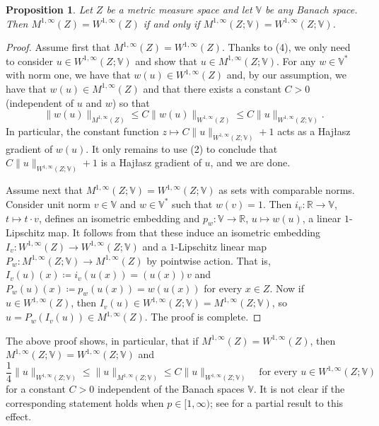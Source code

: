 \documentclass[reqno]{amsart}
\numberwithin{equation}{section}
\newtheorem{proposition}[theorem]{Proposition}
\theoremstyle{remark}
\begin{document}
\begin{proposition}\label{prop:M=W_Banach-valued}
Let $Z$ be a metric measure space and let $\mathbb V$ be any Banach space. Then  $M^{1,\infty}(Z)=W^{1,\infty}(Z)$ if and only if  $M^{1,\infty}(Z;\mathbb V)=W^{1,\infty}(Z;\mathbb V)$.
\end{proposition}
\begin{proof}
Assume first that $M^{1,\infty}(Z)=W^{1,\infty}(Z)$. Thanks to  (4), we only need to consider $u\in W^{1,\infty}(Z;\mathbb V)$ and show that $u\in M^{1,\infty}(Z;\mathbb V)$. For any $w\in \mathbb V^*$ with norm one, we have that $w(u)\in W^{1,\infty}(Z)$ and, by our assumption, we have that $w(u)\in M^{1,\infty}(Z)$ and that there exists a constant $C>0$ (independent of $u$ and $w$) so that
$$\|w(u)\|_{M^{1,\infty}(Z)}\leq C\|w(u)\|_{W^{1,\infty}(Z)} \leq C\|u\|_{W^{1,\infty}(Z;\mathbb{V})} .$$
In particular, the constant function $z \mapsto C\|u\|_{W^{1,\infty}(Z;\mathbb{V})}+1$ acts as a Haj{\l}asz gradient of $w(u)$. It only remains to use  (2) to conclude that $C\|u\|_{W^{1,\infty}(Z;\mathbb V)}+1$ is a Haj{\l}asz gradient of $u$, and we are done.

Assume next that $M^{1,\infty}(Z;\mathbb V)=W^{1,\infty}(Z;\mathbb V)$ as sets with comparable norms. Consider unit norm $v \in \mathbb{V}$ and $w \in \mathbb{V}^{*}$ such that $w(v) = 1$. Then $i_v \colon \mathbb{R} \rightarrow \mathbb{V}$, $t \mapsto t \cdot v$, defines an isometric embedding and $p_w \colon \mathbb{V} \rightarrow \mathbb{R}$, $u \mapsto w(u)$, a linear $1$-Lipschitz map. It follows from  that these induce an isometric embedding $I_v \colon W^{1,\infty}(Z) \rightarrow W^{1,\infty}(Z; \mathbb{V})$ 
and a $1$-Lipschitz linear map $P_w \colon M^{1,\infty}(Z; \mathbb{V}) \rightarrow M^{1,\infty}(Z)$ by pointwise action. That is, $I_v(u)(x)\coloneqq i_v(u(x))=(u(x))v$ and $P_{w}(u)(x)\coloneqq p_w(u(x))=w(u(x))$ for every $x\in Z$. Now if $u \in W^{1,\infty}(Z)$, then $I_v(u) \in W^{1,\infty}(Z; \mathbb{V}) = M^{1,\infty}(Z; \mathbb{V})$, so $u = P_w( I_v(u) ) \in M^{1,\infty}(Z)$. The proof is complete.
\end{proof}
The above proof shows, in particular, that if $M^{1,\infty}(Z)=W^{1,\infty}(Z)$, then $M^{1,\infty}(Z;\mathbb V)=W^{1,\infty}(Z;\mathbb V)$ and
$$\frac{1}{4}\| u  \|_{W^{1,\infty}(Z;\mathbb V)} \leq \|u\|_{M^{1,\infty}(Z;\mathbb V)}\leq C\| u\|_{W^{1,\infty}(Z;\mathbb V)}\quad \text{for every } u\in W^{1,\infty}(Z;\mathbb V)$$
for a constant $C>0$ independent of the Banach spaces $\mathbb V$. It is not clear if the corresponding statement holds when $p \in [1,\infty)$; see \cite[Theorem 1.6]{Garc:Iko:Zhu:23} for a partial result to this effect.
\end{document}
